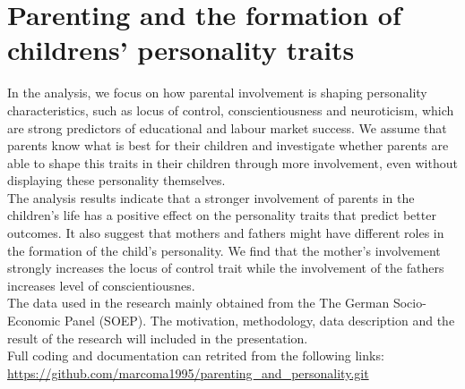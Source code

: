 \documentclass[%
a4paper,            %
11pt,               %
bibliography=totoc, %
]
{scrartcl}
\begin{document}
	\setcounter{secnumdepth}{0}
	\section{Parenting and the formation of childrens' personality traits}
	
	
	In the analysis, we focus on how parental involvement is shaping personality characteristics, such as locus of control, conscientiousness and neuroticism, which are strong predictors of educational and labour market success. We assume that parents know what is best for their children and investigate whether parents are able to shape this traits in their children through more involvement, even without displaying these personality themselves.\\\newline
	The analysis results indicate that a stronger involvement of parents in the children's life has a positive effect on the personality traits that predict better outcomes. It also suggest that mothers and fathers might have different roles in the formation of the child's personality. We find that the mother's involvement strongly increases the locus of control trait while the involvement of the fathers increases level of conscientiousnes.\\\newline
	The data used in the research mainly obtained from the The German Socio-Economic Panel (SOEP). The motivation, methodology, data description and the result of the research will included in the presentation. \\\newline
	Full coding and documentation can retrited from the following links:\\\newline  
	\url{https://github.com/marcoma1995/parenting_and_personality.git}\
	
\end{document}
